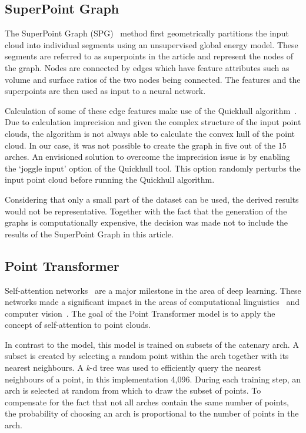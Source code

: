 \subsection{SuperPoint Graph}
The SuperPoint Graph (SPG)~\cite{Landrieu18} method first geometrically partitions the input cloud into individual segments using an unsupervised global energy model. These segments are referred to as superpoints in the article and represent the nodes of the graph. Nodes are connected by edges which have feature attributes such as volume and surface ratios of the two nodes being connected. The features and the superpoints are then used as input to a neural network.

Calculation of some of these edge features make use of the Quickhull algorithm~\cite{qhull}. Due to calculation imprecision and given the complex structure of the input point clouds, the algorithm is not always able to calculate the convex hull of the point cloud. In our case, it was not possible to create the graph in five out of the 15 arches. An envisioned solution to overcome the imprecision issue is by enabling the `joggle input' option of the Quickhull tool. This option randomly perturbs the input point cloud before running the Quickhull algorithm.

Considering that only a small part of the dataset can be used, the derived results would not be representative. Together with the fact that the generation of the graphs is computationally expensive, the decision was made not to include the results of the SuperPoint Graph in this article.

\subsection{Point Transformer}
Self-attention networks~\cite{Vaswani.17} are a major milestone in the area of deep learning. These networks made a significant impact in the areas of computational linguistics~\cite{Devlin.19} and computer vision~\cite{Wang.18}. The goal of the Point Transformer model is to apply the concept of self-attention to point clouds.

In contrast to the \pnpp{} model, this model is trained on subsets of the catenary arch. A subset is created by selecting a random point within the arch together with its nearest neighbours. A \textit{k}-d tree was used to efficiently query the nearest neighbours of a point, in this implementation 4,096. During each training step, an arch is selected at random from which to draw the subset of points. To compensate for the fact that not all arches contain the same number of points, the probability of choosing an arch is proportional to the number of points in the arch. 

